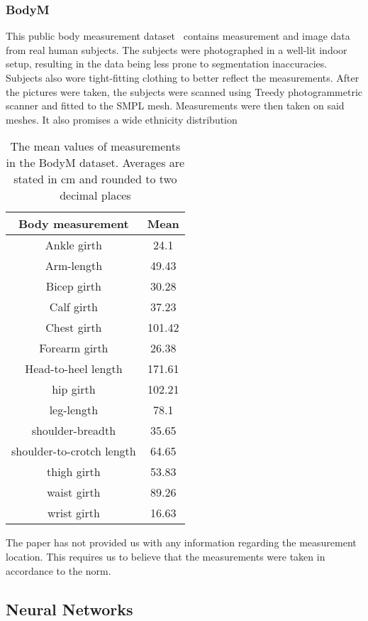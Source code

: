 \subsubsection{BodyM}
This public body measurement dataset~\cite{BodyM} contains measurement and image data from real human subjects. The subjects were photographed in a well-lit indoor setup, resulting in the data being less prone to segmentation inaccuracies. Subjects also wore tight-fitting clothing to better reflect the measurements. After the pictures were taken, the subjects were scanned using Treedy photogrammetric scanner and fitted to the SMPL mesh. Measurements were then taken on said meshes. It also promises a wide ethnicity distribution  

\begin{table}
	\caption[Mean values of BodyM dataset]{The mean values of measurements in the BodyM dataset. Averages are stated in cm and rounded to two decimal places}
	\label{measurementsBodyM}
	\begin{center}
		\begin{tabular}{c c}
			\hline
			Body measurement & Mean\\
			\hline
			\hline
			Ankle girth & 24.1\\
			Arm-length & 49.43\\
			Bicep girth & 30.28\\ 
			Calf girth & 37.23\\ 
			Chest girth & 101.42\\ 
			Forearm girth & 26.38\\
			Head-to-heel length & 171.61\\
			hip girth & 102.21\\
			leg-length & 78.1\\
			shoulder-breadth & 35.65\\
			shoulder-to-crotch length & 64.65\\
			thigh girth & 53.83\\
			waist girth & 89.26\\
			wrist girth & 16.63\\ 
			\hline
		\end{tabular}
	\end{center}
\end{table}
The paper has not provided us with any information regarding the measurement location. This requires us to believe that the measurements were taken in accordance to the norm.

\subsection{Neural Networks}
\label{networks}
